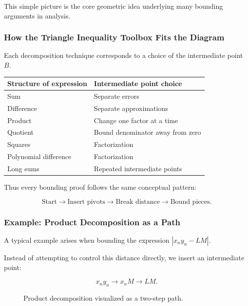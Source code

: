 This simple picture is the core geometric idea underlying many
bounding arguments in analysis.

\bigskip

\subsubsection*{How the Triangle Inequality Toolbox Fits the Diagram}

Each decomposition technique corresponds to a choice of the
intermediate point \(B\).

\begin{center}
\begin{tabular}{ll}
\textbf{Structure of expression} & \textbf{Intermediate point choice} \\
\hline
Sum & Separate errors \\
Difference & Separate approximations \\
Product & Change one factor at a time \\
Quotient & Bound denominator away from zero \\
Squares & Factorization \\
Polynomial difference & Factorization \\
Long sums & Repeated intermediate points
\end{tabular}
\end{center}

Thus every bounding proof follows the same conceptual pattern:

\[
\text{Start} \rightarrow \text{Insert pivots} \rightarrow
\text{Break distance} \rightarrow \text{Bound pieces}.
\]

\bigskip

\subsubsection*{Example: Product Decomposition as a Path}

A typical example arises when bounding the expression
\(|x_n y_n - LM|\).

Instead of attempting to control this distance directly, we insert an
intermediate point:

\[
x_n y_n \rightarrow x_n M \rightarrow LM.
\]

\begin{figure}[h]
\centering
{}

\caption{Product decomposition visualized as a two-step path.}
\end{figure}

